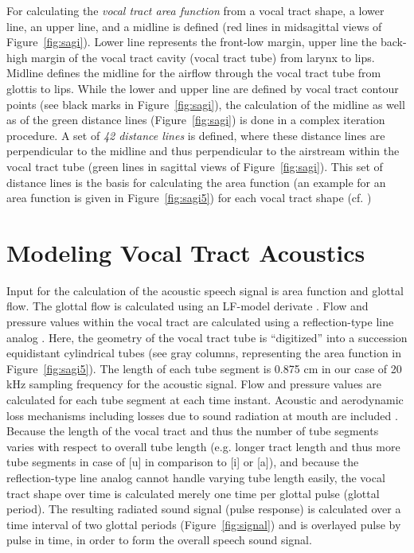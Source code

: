 \documentclass[conference]{IEEEtran}
\begin{document}
For calculating the \textit{vocal tract area function} from a vocal
tract shape, a lower line, an upper line, and a midline is defined
(red lines in midsagittal views of Figure~\ref{fig:sagi}). Lower line
represents the front-low margin, upper line the back-high margin of
the vocal tract cavity (vocal tract tube) from larynx to lips. Midline
defines the midline for the airflow through the vocal tract tube from
glottis to lips. While the lower and upper line are defined by vocal
tract contour points (see black marks in Figure~\ref{fig:sagi}), the
calculation of the midline as well as of the green distance lines
(Figure~\ref{fig:sagi}) is done in a complex iteration procedure. A
set of \textit{42 distance lines} is defined, where these distance
lines are perpendicular to the midline and thus perpendicular to the
airstream within the vocal tract tube (green lines in sagittal views
of Figure~\ref{fig:sagi}). This set of distance lines is the basis for
calculating the area function (an example for an area function is
given in Figure~\ref{fig:sagi5}) for each vocal tract shape (cf.
\cite{perrier1992})

\section{Modeling Vocal Tract Acoustics}

Input for the calculation of the acoustic speech signal is area
function and glottal flow. The glottal flow is calculated using an
LF-model derivate \cite{veldhuis1998}. Flow and pressure values within
the vocal tract are calculated using a reflection-type line analog
\cite{liljencrants1985}. Here, the geometry of the vocal tract tube is
``digitized'' into a succession equidistant cylindrical tubes (see
gray columns, representing the area function in
Figure~\ref{fig:sagi5}). The length of each tube segment is 0.875 cm
in our case of 20 kHz sampling frequency for the acoustic signal. Flow
and pressure values are calculated for each tube segment at each time
instant. Acoustic and aerodynamic loss mechanisms including losses due
to sound radiation at mouth are included \cite{liljencrants1985}.
Because the length of the vocal tract and thus the number of tube
segments varies with respect to overall tube length (e.g. longer tract
length and thus more tube segments in case of [u] in comparison to [i]
or [a]), and because the reflection-type line analog cannot handle
varying tube length easily, the vocal tract shape over time is
calculated merely one time per glottal pulse (glottal period). The
resulting radiated sound signal (pulse response) is calculated over a
time interval of two glottal periods (Figure~\ref{fig:signal}) and is
overlayed pulse by pulse in time, in order to form the overall speech
sound signal.
\end{document}
